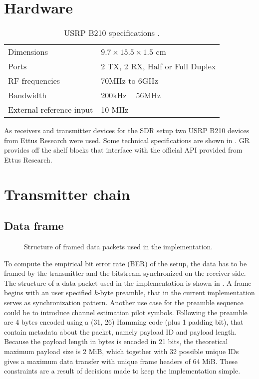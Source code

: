 \section{Hardware}

\begin{table}[b]
	\centering
	\begin{tabular}{ll}
		\toprule
		Dimensions               & \(9.7 \times 15.5 \times 1.5\) cm \\
		Ports                    & 2 TX, 2 RX, Half or Full Duplex   \\
		RF frequencies           & 70MHz to 6GHz                     \\
		Bandwidth                & 200kHz -- 56MHz                   \\
		External reference input & 10 MHz                            \\
		\bottomrule
	\end{tabular}
	\caption{USRP B210 specifications \cite{EttusUSRPB210}. \label{tab:usrp-specs}}
\end{table}

As receivers and transmitter devices for the SDR setup two USRP B210 devices from Ettus Research were used. Some technical specifications are shown in . GR provides off the shelf blocks that interface with the official API provided from Ettus Research.

\section{Transmitter chain}

\subsection{Data frame} \label{sec:data-frame}

\begin{figure}
\centering

	\caption{
		Structure of framed data packets used in the implementation.
		\label{fig:dataframe}
	}
\end{figure}

To compute the empirical bit error rate (BER) of the setup, the data has to be framed by the transmitter and the bitstream synchronized on the receiver side. The structure of a data packet used in the implementation is shown in . A frame begins with an user specified \(k\)-byte preamble, that in the current implementation serves as synchronization pattern. Another use case for the preamble sequence could be to introduce channel estimation pilot symbols. Following the preamble are 4 bytes encoded using a (31, 26) Hamming code (plus 1 padding bit), that contain metadata about the packet, namely payload ID and payload length. Because the payload length in bytes is encoded in 21 bits, the theoretical maximum payload size is 2 MiB, which together with 32 possible unique IDs gives a maximum data transfer with unique frame headers of 64 MiB. These constraints are a result of decisions made to keep the implementation simple.


